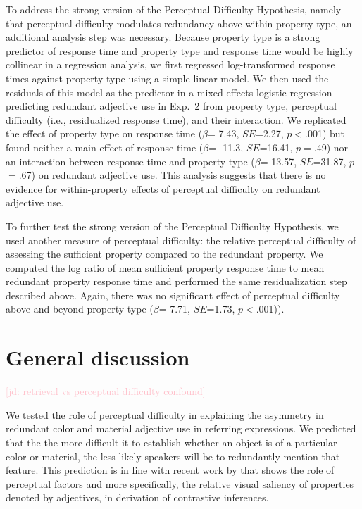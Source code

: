 \documentclass[12pt,letterpaper]{article}
\newcommand{\jd}[1]{\textcolor{Pink}{[jd: #1]}}
\begin{document}
To address the strong version of the Perceptual Difficulty Hypothesis, namely that perceptual difficulty modulates redundancy above within property type, an additional analysis step was necessary. Because property type is a strong predictor of response time and property type and response time would be highly collinear in a regression analysis, we first regressed log-transformed response times against property type using a simple linear model. %
We then used the residuals of this model as the predictor in a mixed effects logistic regression predicting redundant adjective use in Exp.~2 from property type, perceptual difficulty (i.e., residualized response time), and their interaction. We replicated the effect of property type on response time ($\beta$= 7.43, $SE$=2.27, $p$$<$.001) but found neither a main effect of response time ($\beta$= -11.3, $SE$=16.41, $p$$=$.49) nor an interaction between response time and property type ($\beta$= 13.57, $SE$=31.87, $p$$=$.67) on redundant adjective use. This analysis suggests that there is no evidence for within-property effects of perceptual difficulty on redundant adjective use.

To further test the strong version of the Perceptual Difficulty Hypothesis, we used another measure of perceptual difficulty: the relative perceptual difficulty of assessing the sufficient property compared to the redundant property. We computed the log ratio of mean sufficient property response time to   mean redundant property response time and performed the same residualization step described above. Again, there was no significant effect of perceptual difficulty above and beyond property type ($\beta$= 7.71, $SE$=1.73, $p$$<$.001)).



\section{General discussion} 

\jd{retrieval vs perceptual difficulty confound} 

We tested the role of perceptual difficulty in explaining the asymmetry in redundant color and material adjective use in referring expressions. We predicted that the the more difficult it to establish whether an object is of a particular color or material, the less likely speakers will be to redundantly mention that feature. This prediction is in line with recent work by \citet{RubioEtAl2019} that shows the role of perceptual factors and more specifically, the relative visual saliency of properties denoted by adjectives, in derivation of contrastive inferences.
\end{document}
